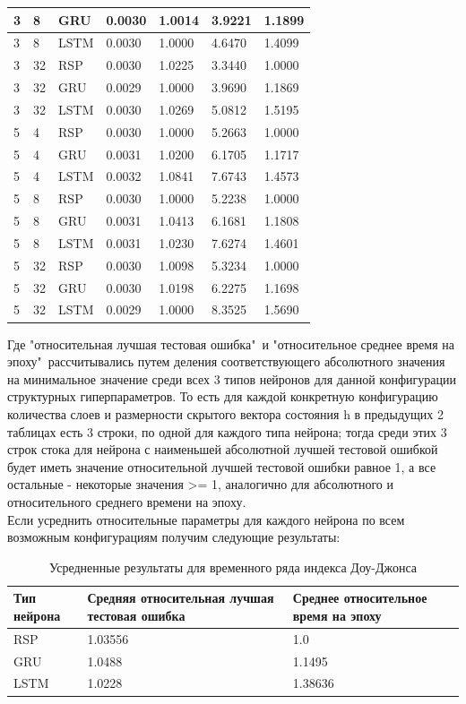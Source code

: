 \documentclass[11pt]{article}
\begin{document}
\begin{table}[H]
\begin{tabular}{|p{1.4cm}|p{1.4cm}|p{1.4cm}|p{1.5cm}|p{2.5cm}|p{1.9cm}|p{2cm}|}
\hline
3 &   8 &   GRU & 0.0030 & 1.0014 & 3.9221 &  1.1899 \\
\hline
3 &   8 &  LSTM & 0.0030 & 1.0000 & 4.6470 &  1.4099 \\
\hline
3 &  32 &   RSP & 0.0030 & 1.0225 & 3.3440 &  1.0000 \\
\hline
3 &  32 &   GRU & 0.0029 & 1.0000 & 3.9690 &  1.1869 \\
\hline
3 &  32 &  LSTM & 0.0030 & 1.0269 & 5.0812 &  1.5195 \\
\hline
5 &   4 &   RSP & 0.0030 & 1.0000 & 5.2663 &  1.0000 \\
\hline
5 &   4 &   GRU & 0.0031 & 1.0200 & 6.1705 &  1.1717 \\
\hline
5 &   4 &  LSTM & 0.0032 & 1.0841 & 7.6743 &  1.4573 \\
\hline
5 &   8 &   RSP & 0.0030 & 1.0000 & 5.2238 &  1.0000 \\
\hline
5 &   8 &   GRU & 0.0031 & 1.0413 & 6.1681 &  1.1808 \\
\hline
5 &   8 &  LSTM & 0.0031 & 1.0230 & 7.6274 &  1.4601 \\
\hline
5 &  32 &   RSP & 0.0030 & 1.0098 & 5.3234 &  1.0000 \\
\hline
5 &  32 &   GRU & 0.0030 & 1.0198 & 6.2275 &  1.1698 \\
\hline
5 &  32 &  LSTM & 0.0029 & 1.0000 & 8.3525 &  1.5690 \\
\hline
\end{tabular}
\end{table}

Где "относительная лучшая тестовая ошибка"\ и "относительное среднее время на эпоху"\ рассчитывались путем деления соответствующего абсолютного значения на минимальное значение среди всех 3 типов нейронов для данной конфигурации структурных гиперпараметров. То есть для каждой конкретную конфигурацию количества слоев и размерности скрытого вектора состояния h в предыдущих 2 таблицах есть 3 строки, по одной для каждого типа нейрона; тогда среди этих 3 строк стока для нейрона с наименьшей абсолютной лучшей тестовой ошибкой будет иметь значение относительной лучшей тестовой ошибки равное 1, а все остальные - некоторые значения >= 1, аналогично для абсолютного и относительного среднего времени на эпоху.
\\
Если усреднить относительные параметры для каждого нейрона по всем возможным конфигурациям получим следующие результаты:

\begin{table}[H]
\caption{Усредненные результаты для временного ряда индекса Доу-Джонса}
\begin{tabular}{ |p{2.2cm}|p{5cm}|p{5cm}|  }
 \hline
  Тип нейрона & Средняя относительная лучшая тестовая ошибка & Среднее относительное время на эпоху \\
  \hline
 RSP & 1.03556 & 1.0 \\
 \hline  
 GRU & 1.0488 & 1.1495 \\
 \hline 
 LSTM & 1.0228 & 1.38636 \\
 \hline
\end{tabular}
\end{table}
\end{document}
